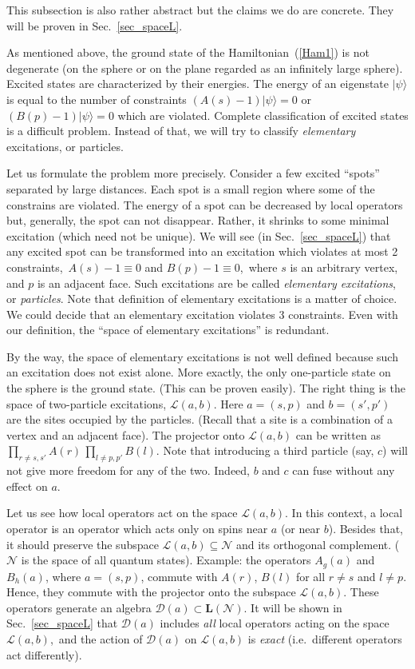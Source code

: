 \documentclass[12pt]{article}
\newcommand{\LL}{\mathbf{L}}
\newcommand{\calD}{\mathcal{D}}
\newcommand{\calL}{\mathcal{L}}
\newcommand{\calN}{\mathcal{N}}
\begin{document}
This subsection is also rather abstract but the claims we do are concrete.
They will be proven in Sec.~\ref{sec_spaceL}.

As mentioned above, the ground state of the Hamiltonian~(\ref{Ham1}) is not
degenerate (on the sphere or on the plane regarded as an infinitely large
sphere). Excited states are characterized by their energies. The energy of an
eigenstate $|\psi\rangle$ is equal to the number of constraints
$(A(s)-1)|\psi\rangle=0$ or $(B(p)-1)|\psi\rangle=0$ which are
violated. Complete classification of excited states is a difficult
problem. Instead of that, we will try to classify \emph{elementary}
excitations, or particles.

Let us formulate the problem more precisely. Consider a few excited ``spots''
separated by large distances. Each spot is a small region where some of the
constrains are violated. The energy of a spot can be decreased by local
operators but, generally, the spot can not disappear.  Rather, it shrinks to
some minimal excitation (which need not be unique).  We will see (in
Sec.~\ref{sec_spaceL}) that any excited spot can be transformed into an
excitation which violates at most 2 constraints,\, $A(s)-1\equiv 0$ and
$B(p)-1\equiv 0$,\, where $s$ is an arbitrary vertex, and $p$ is an adjacent
face. Such excitations are be called
\emph{elementary excitations}, or \emph{particles}. Note that definition of
elementary excitations is a matter of choice. We could decide that an
elementary excitation violates 3 constraints. Even with our definition, the
``space of elementary excitations'' is redundant.

By the way, the space of elementary excitations is not well defined because
such an excitation does not exist alone. More exactly, the only one-particle
state on the sphere is the ground state. (This can be proven easily).  The
right thing is the space of two-particle excitations, $\calL(a,b)$. Here
$a=(s,p)$ and $b=(s',p')$ are the sites occupied by the particles. (Recall
that a site is a combination of a vertex and an adjacent face). The projector
onto $\calL(a,b)$ can be written as
$\prod_{r\not=s,s'}A(r)\,\prod_{l\not=p,p'}B(l)$.  Note that introducing a
third particle (say, $c$) will not give more freedom for any of the
two. Indeed, $b$ and $c$ can fuse without any effect on $a$.

Let us see how local operators act on the space $\calL(a,b)$. In this context,
a local operator is an operator which acts only on spins near $a$ (or near
$b$). Besides that, it should preserve the subspace $\calL(a,b)\subseteq\calN$
and its orthogonal complement. ($\calN$ is the space of all quantum states).
Example: the operators $A_g(a)$ and $B_h(a)$, where $a=(s,p)$, commute with
$A(r)$, $B(l)$ for all $r\not=s$ and $l\not=p$. Hence, they commute with the
projector onto the subspace $\calL(a,b)$. These operators generate an algebra
$\calD(a)\subset\LL(\calN)$. It will be shown in Sec.~\ref{sec_spaceL} that
$\calD(a)$ includes \emph{all} local operators acting on the space
$\calL(a,b)$,\, and the action of $\calD(a)$ on $\calL(a,b)$ is \emph{exact}
(i.e.\ different operators act differently).
\end{document}
